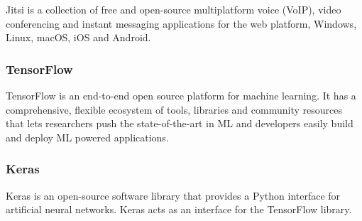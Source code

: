     Jitsi is a collection of free and open-source multiplatform voice (VoIP), video conferencing and instant messaging applications for the web platform, 
    Windows, Linux, macOS, iOS and Android.

    \subsubsection{TensorFlow}
    TensorFlow is an end-to-end open source platform for machine learning. It has a comprehensive, flexible ecosystem of tools, 
    libraries and community resources that lets researchers push the state-of-the-art in ML and developers easily build and deploy ML powered applications.

    \subsubsection{Keras}
    Keras is an open-source software library that provides a Python interface for artificial neural networks. Keras acts as an interface for the TensorFlow library. 